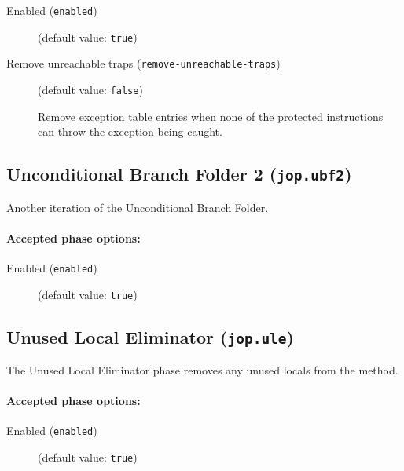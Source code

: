 \documentclass{article}
\begin{document}
\begin{description}

\item[Enabled ({\tt enabled})]
(default value: {\tt true})






\item[Remove unreachable traps ({\tt remove-unreachable-traps})]
(default value: {\tt false})




Remove exception table entries when none of the protected instructions can
throw the exception being caught.



\end{description}

\subsection{Unconditional Branch Folder 2 ({\tt jop.ubf2})}

Another iteration of the Unconditional Branch Folder.


\paragraph{Accepted phase options:} 

\begin{description}

\item[Enabled ({\tt enabled})]
(default value: {\tt true})






\end{description}

\subsection{Unused Local Eliminator ({\tt jop.ule})}

The Unused Local Eliminator phase removes any unused locals from
the method.


\paragraph{Accepted phase options:} 

\begin{description}

\item[Enabled ({\tt enabled})]
(default value: {\tt true})






\end{description}
\end{document}
